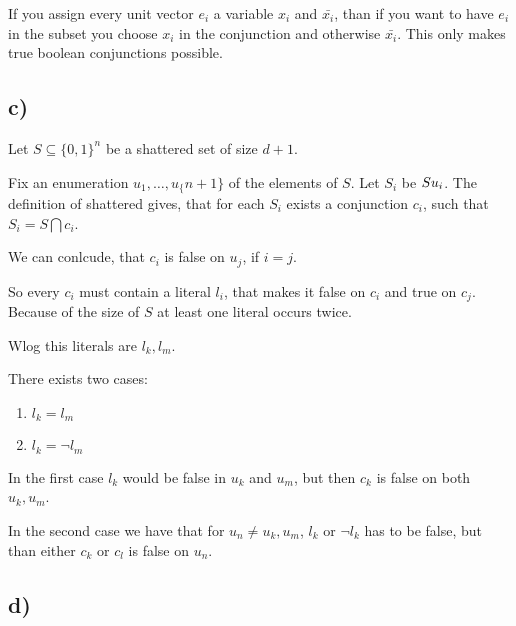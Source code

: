 \documentclass{article}
\begin{document}
If you assign every unit vector $e_i$ a variable $x_i$ and $\bar{x_i}$, than if
you want to have $e_i$ in the subset you choose $x_i$ in the conjunction and
otherwise $\bar{x_i}$. This only makes true boolean conjunctions possible. 

\subsection*{c)}
Let $S\subseteq \{0,1\} ^ n$ be a shattered set of size $d+1$. 

Fix an enumeration $u_1,\ldots,u_\{n+1\}$ of the elements of $S$. Let $S_i$ be
$S\\ u_i$. The definition of shattered gives, that for each $S_i$ exists a
conjunction $c_i$, such that $S_i = S\bigcap c_i$.

We can conlcude, that $c_i$ is false on $u_j$, if $i=j$.

So every $c_i$ must contain a literal $l_i$, that makes it false on $c_i$ and
true on $c_j$. Because of the size of $S$ at least one literal occurs twice.

Wlog this literals are $l_k,l_m$. 

There exists two cases:
\begin{enumerate}
  \item $l_k=l_m$\\
  \item $l_k=\neg l_m$
\end{enumerate}
In the first case $l_k$ would be false in $u_k$ and $u_m$, but then $c_k$ is
false on both $u_k,u_m$.

In the second case we have that for $u_n\neq u_k,u_m$, $l_k \text{ or }\neg l_k$
has to be false, but than either $c_k \text{ or } c_l$ is false on $u_n$.

\subsection*{d)}

\end{document}
